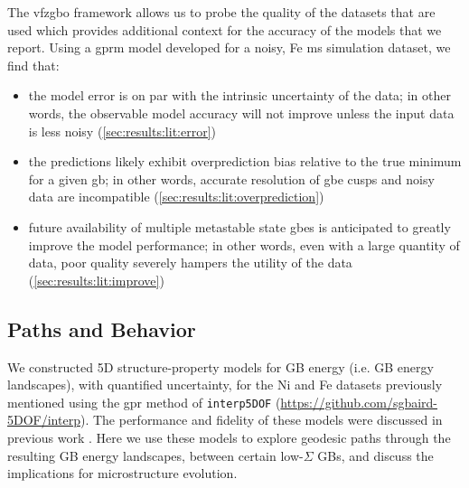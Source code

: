 \documentclass[final,twocolumn,12pt]{elsarticle}
\begin{document}
	The \gls{vfzgbo} framework allows us to probe the quality of the datasets that are used which provides additional context for the accuracy of the models that we report. Using a \gls{gprm} model developed for a noisy, Fe \gls{ms} simulation dataset, we find that:
	\begin{itemize}
		\item the model error is on par with the intrinsic uncertainty of the data; in other words, the observable model accuracy will not improve unless the input data is less noisy (\cref{sec:results:lit:error})
		\item the predictions likely exhibit overprediction bias relative to the true minimum for a given \gls{gb}; in other words, accurate resolution of \gls{gbe} cusps and noisy data are incompatible (\cref{sec:results:lit:overprediction})
		\item future availability of multiple metastable state \glspl{gbe} is anticipated to greatly improve the model performance; in other words, even with a large quantity of data, poor quality severely hampers the utility of the data (\cref{sec:results:lit:improve})
	\end{itemize}

	\subsection{ Paths and  Behavior} \label{sec:results:paths}

    We constructed 5D structure-property models for GB energy (i.e. GB energy landscapes), with quantified uncertainty, for the Ni \cite{olmstedSurveyComputedGrain2009} and Fe \cite{kimPhasefieldModeling3D2014} datasets previously mentioned using the \gls{gpr} method of \texttt{interp5DOF} (\url{https://github.com/sgbaird-5DOF/interp}). The performance and fidelity of these models were discussed in previous work \cite{bairdFiveDegreeoffreedomProperty2021}. Here we use these models to explore geodesic paths through the resulting GB energy landscapes, between certain low-$\Sigma$ GBs, and discuss the implications for microstructure evolution.
    
\end{document}

